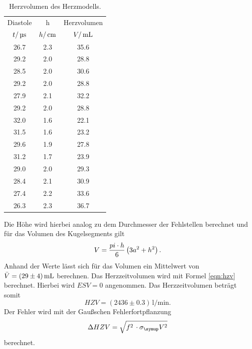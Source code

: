 \begin{table}[H]
  \centering
  \begin{tabular}{ccc}
    \toprule
    \multicolumn{1}{c}{Diastole}&\multicolumn{1}{c}{h}&\multicolumn{1}{c}{Herzvolumen}\\
    $t/\,\si{\micro\second}$ & $h/\,\si{\centi\meter}$ & $V/\,\si{\milli\litre}$ \\
    \midrule
    26.7 & 2.3 & 35.6  \\
    29.2 & 2.0 & 28.8  \\
    28.5 & 2.0 & 30.6  \\
    29.2 & 2.0 & 28.8  \\
    27.9 & 2.1 & 32.2  \\
    29.2 & 2.0 & 28.8  \\
    32.0 & 1.6 & 22.1  \\
    31.5 & 1.6 & 23.2  \\
    29.6 & 1.9 & 27.8  \\
    31.2 & 1.7 & 23.9  \\
    29.0 & 2.0 & 29.3  \\
    28.4 & 2.1 & 30.9  \\
    27.4 & 2.2 & 33.6  \\
    26.3 & 2.3 & 36.7  \\
    \bottomrule
  \end{tabular}
  \caption{Herzvolumen des Herzmodells.}
  \label{tab:dia}
\end{table}
Die Höhe wird hierbei analog zu dem Durchmesser der Fehlstellen berechnet und
für das Volumen des Kugelsegments gilt
\begin{equation*}
  V=\frac{pi\cdot h}{6}\left(3a^2+h^2\right).
\end{equation*}
Anhand der Werte lässt sich für das Volumen ein Mittelwert von $\bar V=(29\pm4)\,\si{\milli\litre}$
berechnen.
Das Herzzeitvolumen wird mit Formel \eqref{eqn:hzv} berechnet. Hierbei wird
$ESV=0$ angenommen.
Das Herzzeitvolumen beträgt somit
\begin{equation*}
  HZV = (2436 \pm 0.3 )\,\si{\litre\per\minute}.
\end{equation*}
Der Fehler wird mit der Gaußschen Fehlerfortpflanzung
\begin{equation*}
  \Delta HZV = \sqrt{f^2\,\cdot\sigma_\su{V}^2}
\end{equation*}
berechnet.
